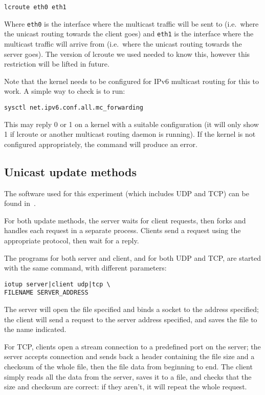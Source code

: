 \documentclass[a4paper,11pt,twocolumn]{article}
\begin{document}
\begin{verbatim}
lcroute eth0 eth1
\end{verbatim}

Where {\tt eth0} is the interface where the multicast traffic will be
sent to (i.e.\ where the unicast routing towards the client goes)
and {\tt eth1} is the interface where the multicast traffic will arrive
from (i.e.\ where the unicast routing towards the server goes). The
version of lcroute we used needed to know this, however this restriction
will be lifted in future.

Note that the kernel needs to be configured for IPv6 multicast routing
for this to work. A simple way to check is to run:

\begin{verbatim}
sysctl net.ipv6.conf.all.mc_forwarding
\end{verbatim}

This may reply 0 or 1 on a kernel with a suitable configuration (it
will only show 1 if lcroute or another multicast routing daemon
is running).  If the kernel is not configured appropriately, the
command will produce an error.

\subsection{Unicast update methods}
\label{unisync}

The software used for this experiment (which includes UDP and TCP) can
be found in~\cite{unisync:sources}.

For both update methods, the server waits for client requests, then
forks and handles each request in a separate process. Clients send
a request using the appropriate protocol, then wait for a reply.

The programs for both server and client, and for both UDP and TCP,
are started with the same command, with different parameters:

\begin{verbatim}
iotup server|client udp|tcp \
FILENAME SERVER_ADDRESS
\end{verbatim}

The server will open the file specified and binds a socket to the
address specified; the client will send a request to the server
address specified, and saves the file to the name indicated.

For TCP, clients open a stream connection to a predefined port on
the server; the server accepts connection and sends back a header
containing the file size and a checksum of the whole file, then
the file data from beginning to end. The client simply reads all
the data from the server, saves it to a file, and checks that
the size and checksum are correct: if they aren't, it will repeat
the whole request.
\end{document}
